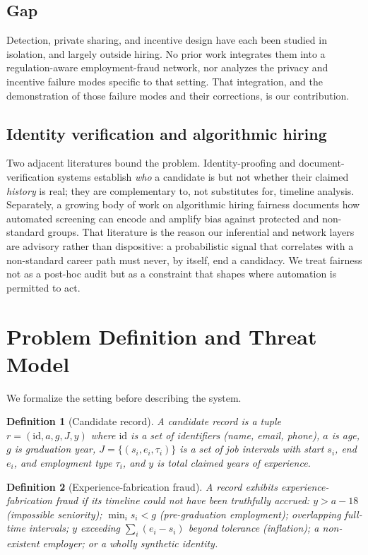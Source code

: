 \documentclass[11pt]{article}
\newtheorem{definition}{Definition}
\begin{document}
\subsection{Gap}
Detection, private sharing, and incentive design have each been studied in
isolation, and largely outside hiring. No prior work integrates them into a
regulation-aware employment-fraud network, nor analyzes the privacy and incentive
failure modes specific to that setting. That integration, and the demonstration
of those failure modes and their corrections, is our contribution.

\subsection{Identity verification and algorithmic hiring}
Two adjacent literatures bound the problem. Identity-proofing and
document-verification systems establish \emph{who} a candidate is but not whether
their claimed \emph{history} is real; they are complementary to, not substitutes
for, timeline analysis. Separately, a growing body of work on algorithmic hiring
fairness documents how automated screening can encode and amplify bias against
protected and non-standard groups. That literature is the reason our inferential
and network layers are advisory rather than dispositive: a probabilistic signal
that correlates with a non-standard career path must never, by itself, end a
candidacy. We treat fairness not as a post-hoc audit but as a constraint that
shapes where automation is permitted to act.

\section{Problem Definition and Threat Model}\label{sec:threat}
We formalize the setting before describing the system.

\begin{definition}[Candidate record]
A candidate record is a tuple $r=(\mathrm{id}, a, g, J, y)$ where $\mathrm{id}$ is
a set of identifiers (name, email, phone), $a$ is age, $g$ is graduation year,
$J=\{(s_i,e_i,\tau_i)\}$ is a set of job intervals with start $s_i$, end $e_i$,
and employment type $\tau_i$, and $y$ is total claimed years of experience.
\end{definition}

\begin{definition}[Experience-fabrication fraud]
A record exhibits experience-fabrication fraud if its timeline could not have been
truthfully accrued: $y > a-18$ (impossible seniority); $\min_i s_i < g$
(pre-graduation employment); overlapping full-time intervals; $y$ exceeding
$\sum_i (e_i-s_i)$ beyond tolerance (inflation); a non-existent employer; or a
wholly synthetic identity.
\end{definition}
\end{document}
